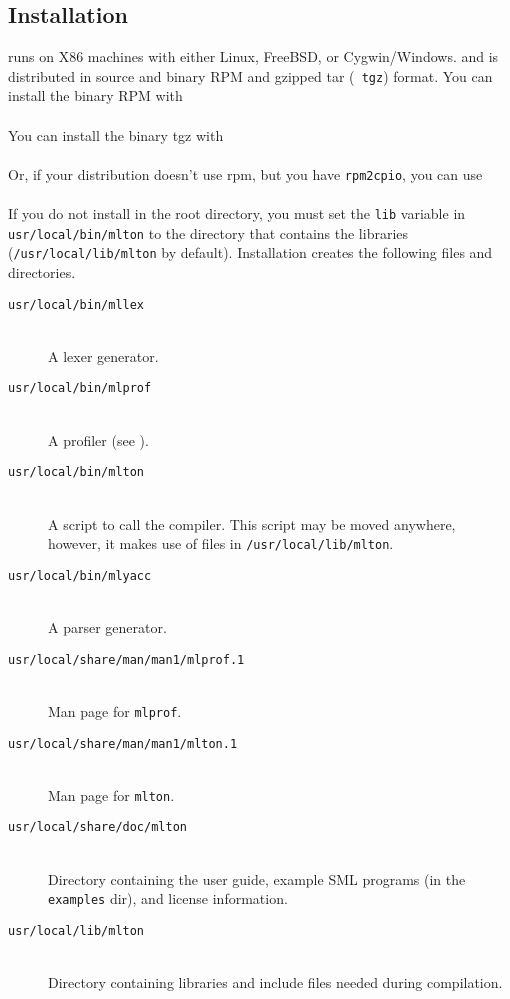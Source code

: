 
\subsection{Installation}

{\mlton} runs on X86 machines with either Linux, FreeBSD, or Cygwin/Windows.
and is distributed in source and binary RPM and gzipped tar ({\tt
tgz}) format.  You can install the binary RPM with\\
\hspace*{2em}{\tt rpm -i mlton-\version-1.i386.rpm}\\
You can install the binary tgz with\\
\hspace*{2em}{\tt zcat mlton-\version-1.i386-linux.tgz | tar x}\\
Or, if your distribution doesn't use rpm, but you have {\tt rpm2cpio},
you can use\\
\hspace*{2em}{\tt rpm2cpio mlton-\version-1.i386.rpm | cpio -id}\\
If you do not install {\mlton} in the root directory, you must
set the {\tt lib} variable in {\tt usr/local/bin/mlton} to the
directory that contains the libraries ({\tt /usr/local/lib/mlton} by
default).
Installation creates the following files and directories.

\newcommand{\place}[1]{\item[\tt #1]\hspace{1in}\\}

\begin{description}

\place{usr/local/bin/mllex}
A lexer generator.

\place{usr/local/bin/mlprof}
A profiler (see ).

\place{usr/local/bin/mlton}
A script to call the compiler.
This script may be moved anywhere, however,
it makes use of files in {\tt /usr/local/lib/mlton}.

\place{usr/local/bin/mlyacc}
A parser generator.

\place{usr/local/share/man/man1/mlprof.1}
Man page for {\tt mlprof}.

\place{usr/local/share/man/man1/mlton.1}
Man page for {\tt mlton}.

\place{usr/local/share/doc/mlton}

Directory containing the user guide, example SML programs (in the {\tt examples}
dir), and license information.

\place{usr/local/lib/mlton}
Directory containing libraries and include files needed during
compilation.

\end{description}

